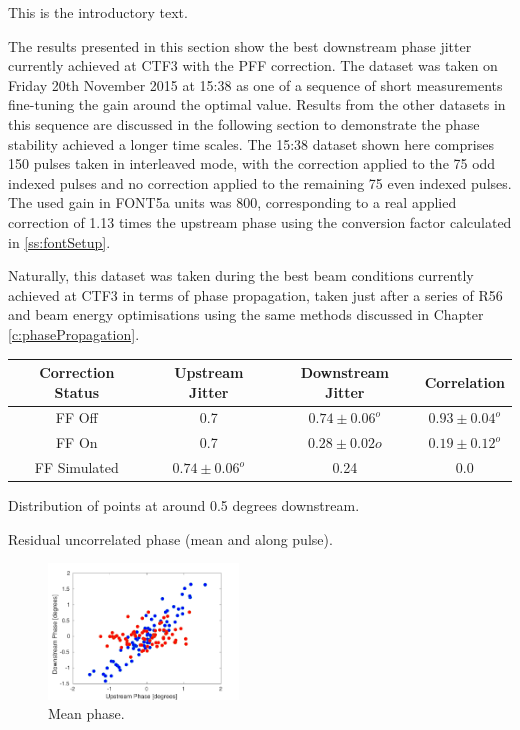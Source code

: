 
This is the introductory text.




The results presented in this section show the best downstream phase jitter currently achieved at CTF3 with the PFF correction. The dataset was taken on Friday 20th November 2015 at 15:38 as one of a sequence of short measurements fine-tuning the gain around the optimal value. Results from the other datasets in this sequence are discussed in the following section to demonstrate the phase stability achieved a longer time scales. The 15:38 dataset shown here comprises 150 pulses taken in interleaved mode, with the correction applied to the 75 odd indexed pulses and no correction applied to the remaining 75 even indexed pulses. The used gain in FONT5a units was 800, corresponding to a real applied correction of 1.13 times the upstream phase using the conversion factor calculated in \ref{ss:fontSetup}.

Naturally, this dataset was taken during the best beam conditions currently achieved at CTF3 in terms of phase propagation, taken just after a series of R56 and beam energy optimisations using the same methods discussed in Chapter \ref{c:phasePropagation}.

\begin{center}
    \begin{tabular}{| c | c | c | c |}
    \hline
    Correction Status & Upstream Jitter & Downstream Jitter & Correlation \\ \hline
    FF Off & 0.7 & \(0.74\pm0.06^o\) & \(0.93\pm0.04^o\) \\
	FF On & 0.7 & \(0.28\pm0.02o\) & \(0.19\pm0.12^o\) \\
	FF Simulated & \(0.74\pm0.06^o\) & 0.24 & 0.0 \\ \hline
    \end{tabular}
\end{center}


Distribution of points at around 0.5 degrees downstream.

Residual uncorrelated phase (mean and along pulse).

\begin{figure}
  \centering
  \includegraphics[width=0.45\textwidth]{Figures/feedforward/BestFF_Real}
  \caption{Mean phase.}
  \label{f:BestFF_Real}
\end{figure}

